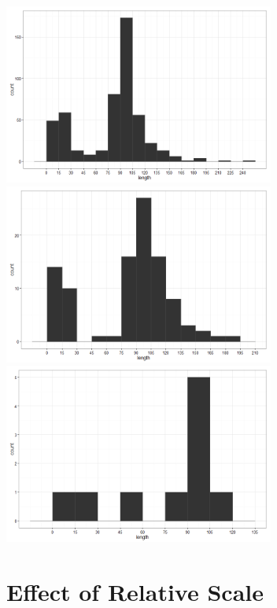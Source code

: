 \documentclass[12pt]{article}
\begin{document}
\includegraphics[width=3.5in]{figure/histsamp-1.png}
\includegraphics[width=3.5in]{figure/histsamp-2.png}\\
\includegraphics[width=3.5in]{figure/histsamp-3.png}

\section{Effect of Relative Scale}\label{effect-of-relative-scale}
\end{document}
